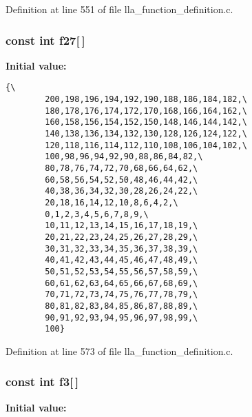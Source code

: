 Definition at line 551 of file lla\_\-function\_\-definition.c.
\subsubsection{\setlength{\rightskip}{0pt plus 5cm}const int {\bf f27}[$\,$]}\label{lla__function__definition_8c_a26}


{\bf Initial value:}

\footnotesize\begin{verbatim}{\
        200,198,196,194,192,190,188,186,184,182,\
        180,178,176,174,172,170,168,166,164,162,\
        160,158,156,154,152,150,148,146,144,142,\
        140,138,136,134,132,130,128,126,124,122,\
        120,118,116,114,112,110,108,106,104,102,\
        100,98,96,94,92,90,88,86,84,82,\
        80,78,76,74,72,70,68,66,64,62,\
        60,58,56,54,52,50,48,46,44,42,\
        40,38,36,34,32,30,28,26,24,22,\
        20,18,16,14,12,10,8,6,4,2,\
        0,1,2,3,4,5,6,7,8,9,\
        10,11,12,13,14,15,16,17,18,19,\
        20,21,22,23,24,25,26,27,28,29,\
        30,31,32,33,34,35,36,37,38,39,\
        40,41,42,43,44,45,46,47,48,49,\
        50,51,52,53,54,55,56,57,58,59,\
        60,61,62,63,64,65,66,67,68,69,\
        70,71,72,73,74,75,76,77,78,79,\
        80,81,82,83,84,85,86,87,88,89,\
        90,91,92,93,94,95,96,97,98,99,\
        100}
\end{verbatim}\normalsize 


Definition at line 573 of file lla\_\-function\_\-definition.c.
\subsubsection{\setlength{\rightskip}{0pt plus 5cm}const int {\bf f3}[$\,$]}\label{lla__function__definition_8c_a2}


{\bf Initial value:}

